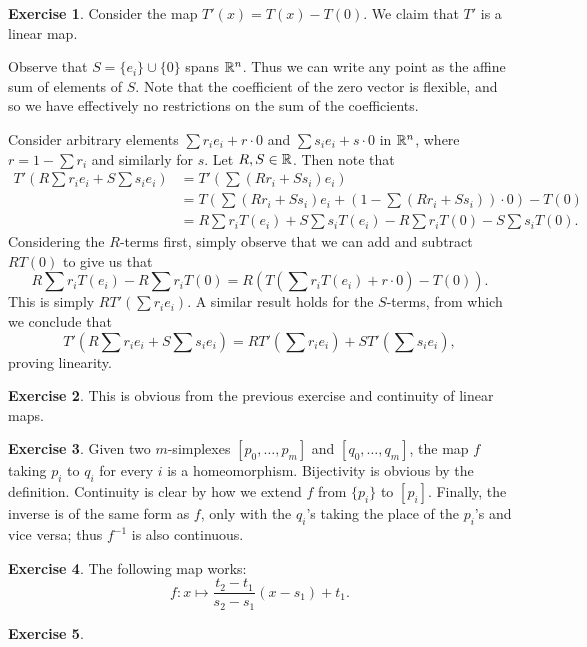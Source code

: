 \documentclass[10pt]{article}
\theoremstyle{definition}
\newtheorem{intex}{Exercise}[section]
\newenvironment{exercise}{\begin{intex}\label{\theintex}}{\end{intex}}
\begin{document}
\begin{exercise} \leavevmode
Consider the map $T'(x)=T(x)-T(0)$. We claim that $T'$ is a linear map. 

Observe that $S=\{e_i\}\cup\{0\}$ spans $\mathbb{R}^n$. Thus we can write any point as the affine sum of elements of $S$. Note that the coefficient of the zero vector is flexible, and so we have effectively no restrictions on the sum of the coefficients. 

Consider arbitrary elements $\sum r_ie_i+r\cdot0$ and $\sum s_ie_i+s\cdot0$ in $\mathbb{R}^n$, where $r=1-\sum r_i$ and similarly for $s$. Let $R,S\in\mathbb{R}$. Then note that \begin{align*}T'\left(R\sum r_ie_i+S\sum s_ie_i\right)&=T'\left(\sum(Rr_i+Ss_i)e_i\right)\\&= T\left(\sum(Rr_i+Ss_i)e_i+\left(1-\sum(Rr_i+Ss_i)\right)\cdot0\right)-T(0)\\&=R\sum r_iT(e_i)+S\sum s_iT(e_i)-R\sum r_iT(0)-S\sum s_iT(0).\end{align*} Considering the $R$-terms first, simply observe that we can add and subtract $RT(0)$ to give us that \[R\sum r_iT(e_i)-R\sum r_iT(0)=R\left(T\left(\sum r_i T(e_i)+r\cdot0\right)-T(0)\right).\] This is simply $RT'\left(\sum r_ie_i\right)$. A similar result holds for the $S$-terms, from which we conclude that \[T'\left(R\sum r_ie_i+S\sum s_ie_i\right)=RT'\left(\sum r_ie_i\right)+ST'\left(\sum s_ie_i\right),\] proving linearity. 
\end{exercise} 

\begin{exercise} \leavevmode
This is obvious from the previous exercise and continuity of linear maps. 
\end{exercise} 

\begin{exercise} \leavevmode
Given two $m$-simplexes $[p_0,\dots,p_m]$ and $[q_0,\dots,q_m]$, the map $f$ taking $p_i$ to $q_i$ for every $i$ is a homeomorphism. Bijectivity is obvious by the definition. Continuity is clear by how we extend $f$ from $\{p_i\}$ to $[p_i]$. Finally, the inverse is of the same form as $f$, only with the $q_i$'s taking the place of the $p_i$'s and vice versa; thus $f^{-1}$ is also continuous. 
\end{exercise} 

\begin{exercise} \leavevmode
The following map works: \[f:x\mapsto\frac{t_2-t_1}{s_2-s_1}(x-s_1)+t_1.\] 
\end{exercise} 

\begin{exercise} \leavevmode

\end{exercise} 
\end{document}
